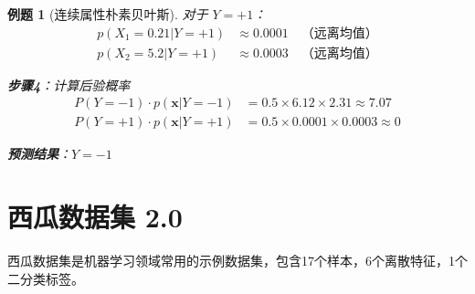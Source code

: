 \documentclass[12pt,a4paper]{ctexart}
\newtheorem{exercise}{例题}[section]
\begin{document}
\begin{exercise}[连续属性朴素贝叶斯]
对于 $Y=+1$：
\begin{align*}
p(X_1=0.21 | Y=+1) &\approx 0.0001 \quad \text{（远离均值）} \\
p(X_2=5.2 | Y=+1) &\approx 0.0003 \quad \text{（远离均值）}
\end{align*}

\textbf{步骤4}：计算后验概率
\begin{align*}
P(Y=-1) \cdot p(\mathbf{x} | Y=-1) &= 0.5 \times 6.12 \times 2.31 \approx 7.07 \\
P(Y=+1) \cdot p(\mathbf{x} | Y=+1) &= 0.5 \times 0.0001 \times 0.0003 \approx 0
\end{align*}

\textbf{预测结果}：$\boxed{Y = -1}$
\end{exercise}


\appendix
\section{西瓜数据集 2.0}

西瓜数据集是机器学习领域常用的示例数据集，包含17个样本，6个离散特征，1个二分类标签。
\end{document}

